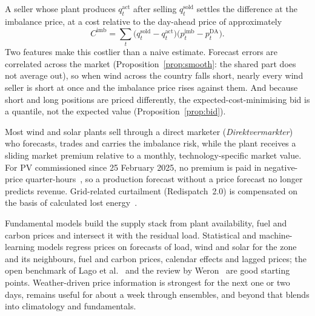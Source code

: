 

 A seller whose plant produces $q^{\text{act}}_t$ after selling $q^{\text{sold}}_t$ settles the difference at the imbalance price, at a cost relative to the day-ahead price of approximately
\begin{equation}
C^{\text{imb}}=\sum_t\big(q^{\text{sold}}_t-q^{\text{act}}_t\big)\big(p^{\text{imb}}_t-p^{\text{DA}}_t\big).
\end{equation}
Two features make this costlier than a naive estimate. Forecast errors are correlated across the market (Proposition~\ref{prop:smooth}: the shared part does not average out), so when wind across the country falls short, nearly every wind seller is short at once and the imbalance price rises against them. And because short and long positions are priced differently, the expected-cost-minimising bid is a quantile, not the expected value (Proposition~\ref{prop:bid}).

 Most wind and solar plants sell through a direct marketer (\emph{Direktvermarkter}) who forecasts, trades and carries the imbalance risk, while the plant receives a sliding market premium relative to a monthly, technology-specific market value. For PV commissioned since 25 February 2025, no premium is paid in negative-price quarter-hours~\cite{roedl2025solarspitzen}, so a production forecast without a price forecast no longer predicts revenue. Grid-related curtailment (Redispatch~2.0) is compensated on the basis of calculated lost energy~\cite{bdew2021ausfallarbeit}.

 Fundamental models build the supply stack from plant availability, fuel and carbon prices and intersect it with the residual load. Statistical and machine-learning models regress prices on forecasts of load, wind and solar for the zone and its neighbours, fuel and carbon prices, calendar effects and lagged prices; the open benchmark of Lago et al.~\cite{lago2021forecasting} and the review by Weron~\cite{weron2014electricity} are good starting points. Weather-driven price information is strongest for the next one or two days, remains useful for about a week through ensembles, and beyond that blends into climatology and fundamentals.

